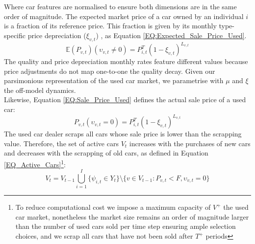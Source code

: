 \documentclass[12pt]{article}
\begin{document}
	Where car features are normalised to ensure both dimensions are in the same order of magnitude.
	The expected market price of a car owned by an individual $i$ is a fraction of its reference price. This fraction is given by its monthly type-specific price depreciation ($\xi_{v,t}$) \citep{SCHLOTER20222Depreciation}, as Equation \ref{EQ:Expected_Sale_Price_Used}.
	\begin{equation}
		\mathbb{E}({P}_{v,t})\left(\upsilon_{v,t}\neq0\right) = P^T_{i,t}(1-\xi_{v,t})^{L_{v,t}}
		\label{EQ:Expected_Sale_Price_Used}
	\end{equation}
	The quality and price depreciation monthly rates feature different values because price adjustments do not map one-to-one the quality decay. Given our parsimonious representation of the used car market, we parametrise with $\mu$ and $\xi$ the off-model dynamics.\\
	Likewise, Equation \ref{EQ:Sale_Price_Used} defines the actual sale price of a used car:
	\begin{equation}
		{P}_{v,t}\left(\upsilon_{v,t}=0\right) = P^T_{i,t}(1-\xi_{v,t})^{L_{v,t}}
		\label{EQ:Sale_Price_Used}
	\end{equation}
	The used car dealer scraps all cars whose sale price is lower than the scrapping value. Therefore, the set of active cars $V_t$ increases with the purchases of new cars and decreases with the scrapping of old cars, as defined in Equation \ref{EQ_Active_Cars}\footnote{To reduce computational cost we impose a maximum capacity of $V^+$ the used car market, nonetheless the market size remains an order of magnitude larger than the number of used cars sold per time step ensuring ample selection choices, and we scrap all cars that have not been sold after $T^+$ periods}:
	\begin{equation}
		V_t = V_{t-1} \bigcup_{i=1}^{I} \{ \psi_{i,t} \in Y_t\}\setminus\{v\in{V_{t-1}}:P_{v,t}<F,\upsilon_{v,t}=0\}
		\label{EQ_Active_Cars}
	\end{equation}
\end{document}
